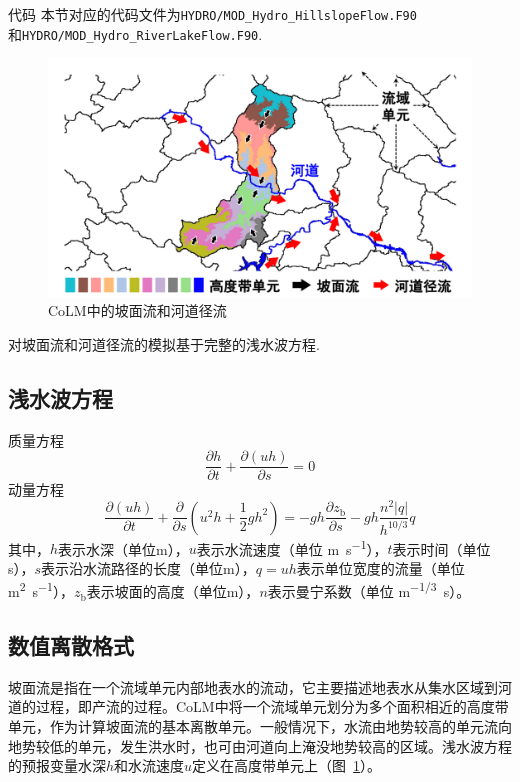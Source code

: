 \begin{mymdframed}{代码}
  本节对应的代码文件为\texttt{HYDRO/MOD\_Hydro\_HillslopeFlow.F90} \\
  和\texttt{HYDRO/MOD\_Hydro\_RiverLakeFlow.F90}.
\end{mymdframed}

{
  \begin{figure}[htbp]
    \centering
    \includegraphics[width=\textwidth]{Figures/侧向流/坡面流和河道径流.pdf}
    \caption{CoLM中的坡面流和河道径流}
    \label{fig:坡面流和河道径流}
  \end{figure}
}

对坡面流和河道径流的模拟基于完整的浅水波方程.
\subsection{浅水波方程}
质量方程
\begin{equation}
  \frac{\partial h}{\partial t} + \frac{\partial \left(uh\right)}{\partial s} = 0
\end{equation}
动量方程
\begin{equation}
  \frac{\partial \left(uh\right)}{\partial t} + \frac{\partial}{\partial s}\left(u^2h+\frac{1}{2}gh^2\right) = -gh\frac{\partial z_{\mathrm {b}} }{\partial s}-gh\frac{n^2\left|q\right|}{h^{10/3}}q
\end{equation}
其中，$h$表示水深（单位m），$u$表示水流速度（单位 \unit{m.s^{-1}}），$t$表示时间（单位s），$s$表示沿水流路径的长度（单位m），$q=uh$表示单位宽度的流量（单位 \unit{m^2.s^{-1}}），$z_{\mathrm {b}} $表示坡面的高度（单位m），$n$表示曼宁系数（单位 \unit{m^{-1/3}.s}）。


\subsection{数值离散格式}
坡面流是指在一个流域单元内部地表水的流动，它主要描述地表水从集水区域到河道的过程，即产流的过程。CoLM中将一个流域单元划分为多个面积相近的高度带单元，作为计算坡面流的基本离散单元。一般情况下，水流由地势较高的单元流向地势较低的单元，发生洪水时，也可由河道向上淹没地势较高的区域。浅水波方程的预报变量水深$h$和水流速度$u$定义在高度带单元上（图~\ref{fig:坡面流和河道径流}）。

